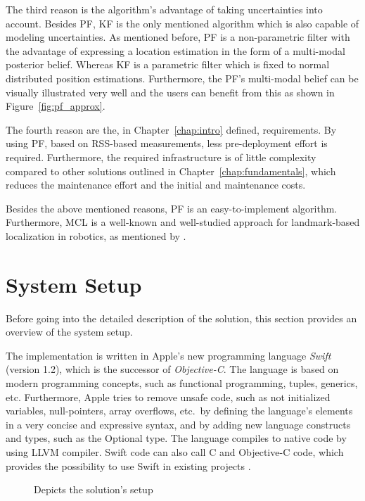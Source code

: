 The third reason is the algorithm's advantage of taking uncertainties into account. Besides \ac{PF}, \ac{KF} is the only mentioned algorithm which is also capable of modeling uncertainties. As mentioned before, \acs{PF} is a non-parametric filter with the advantage of expressing a location estimation in the form of a multi-modal posterior belief. Whereas \ac{KF} is a parametric filter which is fixed to normal distributed position estimations. Furthermore, the \ac{PF}'s multi-modal belief can be visually illustrated very well and the users can benefit from this as shown in Figure~\ref{fig:pf_approx}.

The fourth reason are the, in Chapter~\ref{chap:intro} defined, requirements. By using \acs{PF}, based on \acs{RSS}-based measurements, less pre-deployment effort is required. Furthermore, the required infrastructure is of little complexity compared to other solutions outlined in Chapter~\ref{chap:fundamentals}, which reduces the maintenance effort and the initial and maintenance costs.

Besides the above mentioned reasons, \acl{PF} is an easy-to-implement algorithm. Furthermore, \ac{MCL} is a well-known and well-studied approach for landmark-based localization in robotics, as mentioned by \citet{thrun:prob_robo}.


\section{System Setup}
Before going into the detailed description of the solution, this section provides an overview of the system setup.

The implementation is written in Apple's new programming language \emph{Swift} (version 1.2), which is the successor of \emph{Objective-C}. The language is based on modern programming concepts, such as functional programming, tuples, generics, etc. Furthermore, Apple tries to remove unsafe code, such as not initialized variables, null-pointers, array overflows, etc.\ by defining the language's elements in a very concise and expressive syntax, and by adding new language constructs and types, such as the Optional type. The language compiles to native code by using LLVM compiler. Swift code can also call C and Objective-C code, which provides the possibility to use Swift in existing projects \citep{apple:swift}.

\begin{figure}[height=0.45\textheight]
	
	\caption{Depicts the solution's setup}
	\label{fig:algo_architecture}
\end{figure}

